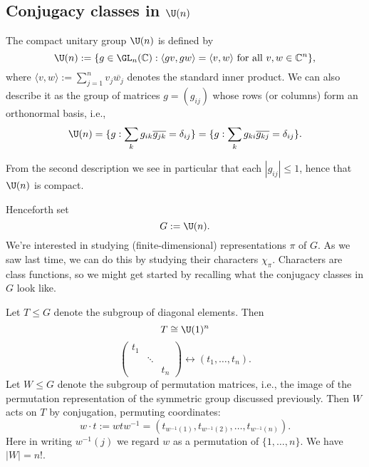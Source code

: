\documentclass[reqno]{amsart} 
\begin{document}
\subsection{Conjugacy classes in \texorpdfstring{$\U(n)$}{U(n)}}\label{sec:cnh2voah2u}
\begin{definition}
  The compact unitary group $\U(n)$ is defined by
  \begin{equation}
    \U(n) := \{g \in \GL_n(\mathbb{C}) : \langle g v, g w
    \rangle
    = \langle v, w \rangle \text{ for all } v,w
    \in \mathbb{C}^n\},
  \end{equation}
  where $\langle v, w \rangle := \sum_{j=1}^n v_j \overline{w_j}$ denotes the standard inner product.  We can also describe it as the group of matrices $g = (g_{i j})$ whose rows (or columns) form an orthonormal basis, i.e.,
  \begin{equation*}
    \U(n) = \{g : \sum_k g_{i k} \overline{g_{j k}} = \delta_{i j} \} = \{g : \sum_k g_{k i} \overline{g_{k j}} = \delta_{i j} \}.
  \end{equation*}
\end{definition}
From the second description we see in particular that each $|g_{i j}| \leq 1$, hence that $\U(n)$ is compact.

Henceforth set
\begin{equation*}
  G := \U(n).
\end{equation*}
We're interested in studying (finite-dimensional) representations $\pi$ of $G$.  As we saw last time, we can do this by studying their characters $\chi_\pi$.  Characters are class functions, so we might get started by recalling what the conjugacy classes in $G$ look like.

Let $T \leq G$ denote the subgroup of diagonal elements.  Then
\begin{equation*}
  T \cong \U(1)^n
\end{equation*}
\begin{equation*}
  \begin{pmatrix}
    t_1 &  &  \\
        & \ddots  &  \\
        & & t_n
  \end{pmatrix}
  \leftrightarrow (t_1,\dotsc,t_n).
\end{equation*}
Let $W \leq G$ denote the subgroup of permutation matrices, i.e., the image of the permutation representation of the symmetric group discussed previously.  Then $W$ acts on $T$ by conjugation, permuting coordinates:
\begin{equation*}
  w \cdot t := w t w^{-1} = (t_{w^{-1}(1)}, t_{w^{-1}(2)},\dotsc , t_{w^{-1}(n)}).
\end{equation*}
Here in writing $w^{-1}(j)$ we regard $w$ as a permutation of $\{1,\dotsc,n\}$.  We have $|W| = n!$.
\end{document}
